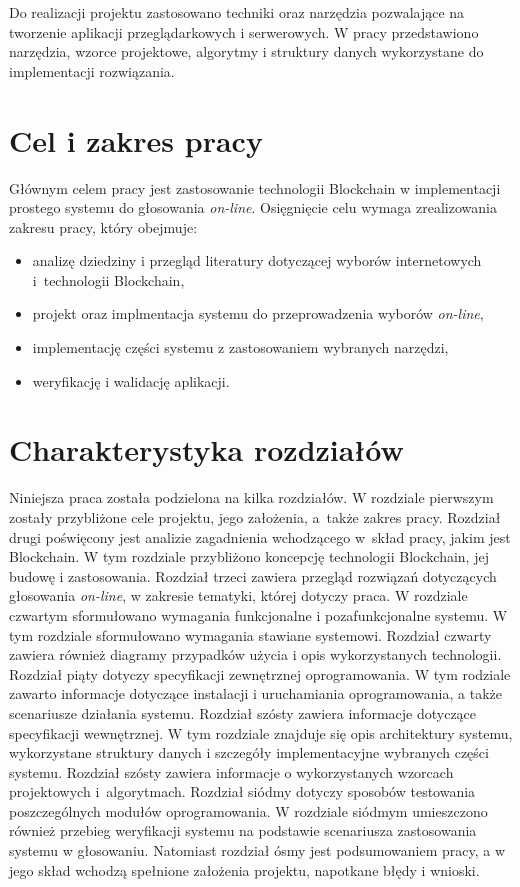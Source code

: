 \documentclass[a4paper,12pt]{book}
\begin{document}
Do realizacji projektu zastosowano techniki oraz narzędzia pozwalające na tworzenie aplikacji przeglądarkowych i serwerowych. W pracy przedstawiono narzędzia, wzorce projektowe, algorytmy i struktury danych wykorzystane do implementacji rozwiązania.

\section{Cel i zakres pracy}
Głównym celem pracy jest zastosowanie technologii Blockchain w implementacji prostego systemu do głosowania \textit{on-line}. Osięgnięcie celu wymaga zrealizowania zakresu pracy, który obejmuje:

\begin{itemize}
	\item analizę dziedziny i przegląd literatury dotyczącej wyborów internetowych i~technologii Blockchain,
	\item projekt oraz implmentacja systemu do przeprowadzenia wyborów \textit{on-line},
	\item implementację części systemu z zastosowaniem wybranych narzędzi,
	\item weryfikację i walidację aplikacji.
\end{itemize}

\section{Charakterystyka rozdziałów}

Niniejsza praca została podzielona na kilka rozdziałów. W rozdziale pierwszym zostały przybliżone cele projektu, jego założenia, a~także zakres pracy. Rozdział drugi poświęcony jest analizie zagadnienia wchodzącego w~skład pracy, jakim jest Blockchain. W tym rozdziale przybliżono koncepcję technologii Blockchain, jej budowę i zastosowania. Rozdział trzeci zawiera przegląd rozwiązań dotyczących głosowania \textit{on-line}, w zakresie tematyki, której dotyczy praca. W rozdziale czwartym sformułowano wymagania funkcjonalne i pozafunkcjonalne systemu. W tym rozdziale sformułowano wymagania stawiane systemowi. Rozdział czwarty zawiera również diagramy przypadków użycia i opis wykorzystanych technologii. Rozdział piąty dotyczy specyfikacji zewnętrznej oprogramowania. W tym rodziale zawarto informacje dotyczące instalacji i uruchamiania oprogramowania, a także scenariusze działania systemu. Rozdział szósty zawiera informacje dotyczące specyfikacji wewnętrznej. W tym rozdziale znajduje się opis architektury systemu, wykorzystane struktury danych i szczegóły implementacyjne wybranych części systemu. Rozdział szósty zawiera informacje o wykorzystanych wzorcach projektowych i~algorytmach. Rozdział siódmy dotyczy sposobów testowania poszczególnych modułów oprogramowania. W rozdziale siódmym umieszczono również przebieg weryfikacji systemu na podstawie scenariusza zastosowania systemu w głosowaniu. Natomiast rozdział ósmy jest podsumowaniem pracy, a w jego skład wchodzą spełnione założenia projektu, napotkane błędy i wnioski.
\end{document}
